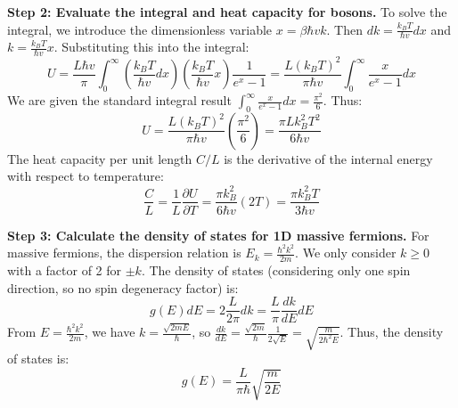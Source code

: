 \begin{solution}
\textbf{Step 2: Evaluate the integral and heat capacity for bosons.}
To solve the integral, we introduce the dimensionless variable $x = \beta \hbar v k$. Then $dk = \frac{k_B T}{\hbar v} dx$ and $k = \frac{k_B T}{\hbar v} x$.
Substituting this into the integral:
\begin{equation*}
    U = \frac{L \hbar v}{\pi} \int_0^\infty \left( \frac{k_B T}{\hbar v} dx \right) \left( \frac{k_B T}{\hbar v} x \right) \frac{1}{e^x - 1} = \frac{L (k_B T)^2}{\pi \hbar v} \int_0^\infty \frac{x}{e^x - 1} dx
\end{equation*}
We are given the standard integral result $\int_0^\infty \frac{x}{e^x - 1} dx = \frac{\pi^2}{6}$. Thus:
\begin{equation*}
    U = \frac{L (k_B T)^2}{\pi \hbar v} \left( \frac{\pi^2}{6} \right) = \frac{\pi L k_B^2 T^2}{6 \hbar v}
\end{equation*}
The heat capacity per unit length $C/L$ is the derivative of the internal energy with respect to temperature:
\begin{equation*}
    \frac{C}{L} = \frac{1}{L} \frac{\partial U}{\partial T} = \frac{\pi k_B^2}{6 \hbar v} (2T) = \frac{\pi k_B^2 T}{3 \hbar v}
\end{equation*}

\textbf{Step 3: Calculate the density of states for 1D massive fermions.}
For massive fermions, the dispersion relation is $E_k = \frac{\hbar^2 k^2}{2m}$. We only consider $k \ge 0$ with a factor of 2 for $\pm k$. The density of states (considering only one spin direction, so no spin degeneracy factor) is:
\begin{equation*}
    g(E) dE = 2 \frac{L}{2\pi} dk = \frac{L}{\pi} \frac{dk}{dE} dE
\end{equation*}
From $E = \frac{\hbar^2 k^2}{2m}$, we have $k = \frac{\sqrt{2mE}}{\hbar}$, so $\frac{dk}{dE} = \frac{\sqrt{2m}}{\hbar} \frac{1}{2\sqrt{E}} = \sqrt{\frac{m}{2\hbar^2 E}}$.
Thus, the density of states is:
\begin{equation*}
    g(E) = \frac{L}{\pi \hbar} \sqrt{\frac{m}{2E}}
\end{equation*}


\end{solution}
